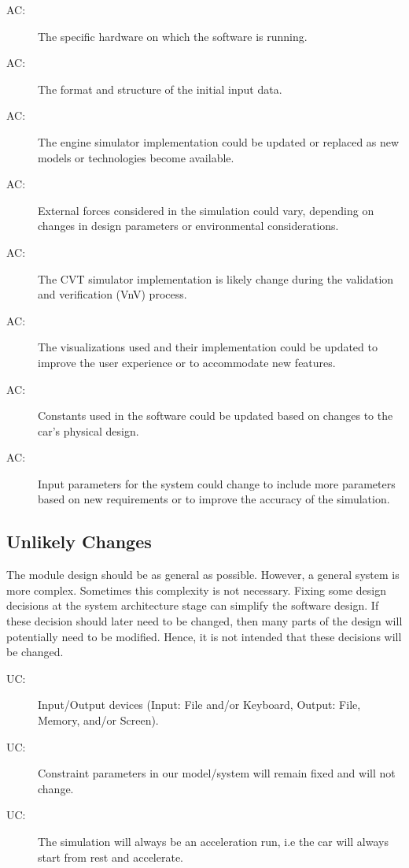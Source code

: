 \documentclass[12pt, titlepage]{article}
\newcounter{acnum}
\newcommand{\actheacnum}{AC\theacnum}
\newcounter{ucnum}
\newcommand{\uctheucnum}{UC\theucnum}
\begin{document}
\begin{description}
  \item[ \actheacnum \label{acHardware}:] The specific hardware on which the software is running.
  \item[ \actheacnum \label{acInput}:] The format and structure of the initial input data.
  \item[ \actheacnum \label{acEngineSimulator}:] The engine simulator implementation could be updated or replaced as new models or technologies become available.
  \item[ \actheacnum \label{acExternalForces}:] External forces considered in the simulation could vary, depending on changes in design parameters or environmental considerations.
  \item[ \actheacnum \label{acCVTSimulator}:] The CVT simulator implementation is likely change during the validation and verification (VnV) process.
  \item[ \actheacnum \label{acVisualizations}:] The visualizations used and their implementation could be updated to improve the user experience or to accommodate new features.
  \item[ \actheacnum \label{acConstants}:] Constants used in the software could be updated based on changes to the car's physical design.
  \item[ \actheacnum \label{acInputParameters}:] Input parameters for the system could change to include more parameters based on new requirements or to improve the accuracy of the simulation.
  \end{description}

\subsection{Unlikely Changes} \label{SecUchange}

The module design should be as general as possible. However, a general system is
more complex. Sometimes this complexity is not necessary. Fixing some design
decisions at the system architecture stage can simplify the software design. If
these decision should later need to be changed, then many parts of the design
will potentially need to be modified. Hence, it is not intended that these
decisions will be changed.

\begin{description}
  \item[ \uctheucnum \label{ucIO}:] Input/Output devices (Input: File and/or Keyboard, Output: File, Memory, and/or Screen).
  \item[ \uctheucnum \label{ucConstraints}:] Constraint parameters in our model/system will remain fixed and will not change.
  \item[ \uctheucnum \label{ucExcelRun}:] The simulation will always be an acceleration run, i.e the car will always start from rest and accelerate.
\end{description}
\end{document}
